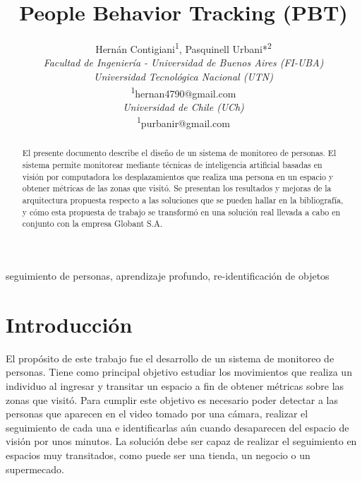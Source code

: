 \documentclass[a4paper]{IEEEtran}
\begin{document}
\title{People Behavior Tracking (PBT)\\}

\author{
Hernán Contigiani\textsuperscript{\dag}\textsuperscript{1}, Pasquinell Urbani*\textsuperscript{2} \\
\textsuperscript{\dag}\textit{Facultad de Ingeniería - Universidad de Buenos Aires (FI-UBA)} \\
\textit{Universidad Tecnológica Nacional (UTN)} \\
\textsuperscript{1}\small hernan4790@gmail.com \\
\normalsize *\textit{Universidad de Chile (UCh)} \\
\textsuperscript{1}\small purbanir@gmail.com
}
\maketitle

\begin{abstract}
El presente documento describe el diseño de un sistema de monitoreo de personas. El sistema permite monitorear mediante técnicas de inteligencia artificial basadas en visión por computadora los desplazamientos que realiza una persona en un espacio y obtener métricas de las zonas que visitó. Se presentan los resultados y mejoras de la arquitectura propuesta respecto a las soluciones que se pueden hallar en la bibliografía, y cómo esta propuesta de trabajo se transformó en una solución real llevada a cabo en conjunto con la empresa Globant S.A.
\end{abstract}

\begin{IEEEkeywords}
seguimiento de personas, aprendizaje profundo, re-identificación de objetos
\end{IEEEkeywords}

\section{Introducción}
El propósito de este trabajo fue el desarrollo de un sistema de monitoreo de personas. Tiene como principal objetivo estudiar los movimientos que realiza un individuo al ingresar y transitar un espacio a fin de obtener métricas sobre las zonas que visitó. Para cumplir este objetivo es necesario poder detectar a las personas que aparecen en el video tomado por una cámara, realizar el seguimiento de cada una e identificarlas aún cuando desaparecen del espacio de visión por unos minutos. La solución debe ser capaz de realizar el seguimiento en espacios muy transitados, como puede ser una tienda, un negocio o un supermecado.
\end{document}
